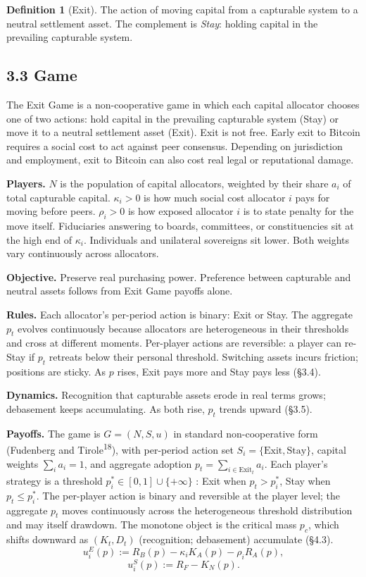 \documentclass[12pt]{article}
\theoremstyle{definition}
\newtheorem{definition}{Definition}
\theoremstyle{remark}
\begin{document}
\begin{definition}[Exit]
The action of moving capital from a capturable system to a neutral
settlement asset. The complement is \emph{Stay}: holding
capital in the prevailing capturable system.
\end{definition}

\subsection{3.3 Game}

The Exit Game is a non-cooperative game in which each capital allocator chooses one of two actions: hold capital in the prevailing capturable system (Stay) or move it to a neutral settlement asset (Exit). Exit is not free. Early exit to Bitcoin requires a social cost to act against peer consensus. Depending on jurisdiction and employment, exit to Bitcoin can also cost real legal or reputational damage.

\smallskip
\noindent\textbf{Players.} $N$ is the population of capital allocators, weighted by their share $a_i$ of total capturable capital. $\kappa_i > 0$ is how much social cost allocator $i$ pays for moving before peers. $\rho_i > 0$ is how exposed allocator $i$ is to state penalty for the move itself. Fiduciaries answering to boards, committees, or constituencies sit at the high end of $\kappa_i$. Individuals and unilateral sovereigns sit lower. Both weights vary continuously across allocators.

\smallskip
\noindent\textbf{Objective.} Preserve real purchasing power. Preference between capturable and neutral assets follows from Exit Game payoffs alone.

\smallskip
\noindent\textbf{Rules.} Each allocator's per-period action is binary: Exit or Stay. The aggregate $p_t$ evolves continuously because allocators are heterogeneous in their thresholds and cross at different moments. Per-player actions are reversible: a player can re-Stay if $p_t$ retreats below their personal threshold. Switching assets incurs friction; positions are sticky. As $p$ rises, Exit pays more and Stay pays less (\S3.4).

\smallskip
\noindent\textbf{Dynamics.} Recognition that capturable assets erode in real terms grows; debasement keeps accumulating. As both rise, $p_t$ trends upward (\S3.5).

\smallskip
\noindent\textbf{Payoffs.} The game is $G = (N, S, u)$ in standard non-cooperative form (Fudenberg and Tirole\textsuperscript{18}), with per-period action set $S_i = \{\text{Exit}, \text{Stay}\}$, capital weights $\sum_i a_i = 1$, and aggregate adoption $p_t = \sum_{i \in \text{Exit}_t} a_i$. Each player's strategy is a threshold $p_i^* \in [0, 1] \cup \{+\infty\}$ : Exit when $p_t > p_i^*$, Stay when $p_t \le p_i^*$. The per-player action is binary and reversible at the player level; the aggregate $p_t$ moves continuously across the heterogeneous threshold distribution and may itself drawdown. The monotone object is the critical mass $p_c$, which shifts downward as $(K_t, D_t)$ (recognition; debasement) accumulate (\S4.3).
\[
u_i^E(p) := R_B(p) - \kappa_i K_A(p) - \rho_i R_A(p),
\]
\[
u_i^S(p) := R_F - K_N(p).
\]
\end{document}
